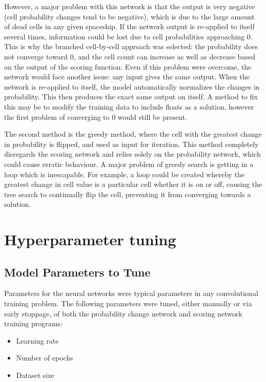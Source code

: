 \documentclass{l4proj}
\begin{document}
However, a major problem with this network is that the output is very negative (cell probability changes tend to be negative), which is due to the large amount of dead cells in any given spaceship. If the network output is re-applied to itself several times, information could be lost due to cell probabilities approaching 0. This is why the branched cell-by-cell approach was selected: the probability does not converge toward 0, and the cell count can increase as well as decrease based on the output of the scoring function. Even if this problem were overcome, the network would face another issue: any input gives the same output. When the network is re-applied to itself, the model automatically normalizes the changes in probability. This then produces the exact same output on itself. A method to fix this may be to modify the training data to include floats as a solution, however the first problem of converging to 0 would still be present.

The second method is the greedy method, where the cell with the greatest change in probability is flipped, and used as input for iteration. This method completely disregards the scoring network and relies solely on the probability network, which could cause erratic behaviour. A major problem of greedy search is getting in a loop which is inescapable. For example, a loop could be created whereby the greatest change in cell value is a particular cell whether it is on or off, causing the tree search to continually flip the cell, preventing it from converging towards a solution. 

\section{Hyperparameter tuning}

\subsection{Model Parameters to Tune}

Parameters for the neural networks were typical parameters in any convolutional training problem. The following parameters were tuned, either manually or via early stoppage, of both the probability change network and scoring network training programs:

\begin{itemize}
    \item Learning rate
    \item Number of epochs
    \item Dataset size
\end{itemize}
\end{document}
